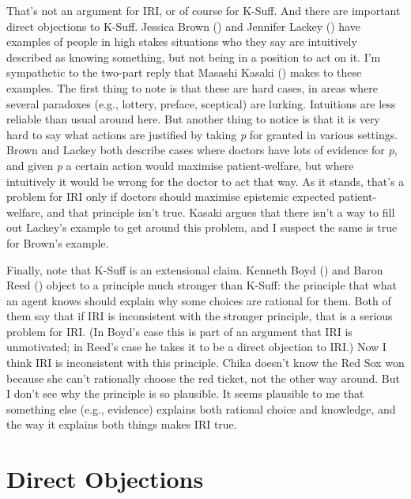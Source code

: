 \documentclass[
  11pt,
  letterpaper,
  DIV=11,
  numbers=noendperiod,
  twoside]{scrartcl}
\begin{document}
That's not an argument for IRI, or of course for K-Suff. And there are
important direct objections to K-Suff. Jessica Brown
() and Jennifer Lackey
() have examples of people in high stakes
situations who they say are intuitively described as knowing something,
but not being in a position to act on it. I'm sympathetic to the
two-part reply that Masashi Kasaki ()
makes to these examples. The first thing to note is that these are hard
cases, in areas where several paradoxes (e.g., lottery, preface,
sceptical) are lurking. Intuitions are less reliable than usual around
here. But another thing to notice is that it is very hard to say what
actions are justified by taking \emph{p} for granted in various
settings. Brown and Lackey both describe cases where doctors have lots
of evidence for \emph{p}, and given \emph{p} a certain action would
maximise patient-welfare, but where intuitively it would be wrong for
the doctor to act that way. As it stands, that's a problem for IRI only
if doctors should maximise epistemic expected patient-welfare, and that
principle isn't true. Kasaki argues that there isn't a way to fill out
Lackey's example to get around this problem, and I suspect the same is
true for Brown's example.

Finally, note that K-Suff is an extensional claim. Kenneth Boyd
() and Baron Reed
() object to a principle much stronger than
K-Suff: the principle that what an agent knows should explain why some
choices are rational for them. Both of them say that if IRI is
inconsistent with the stronger principle, that is a serious problem for
IRI. (In Boyd's case this is part of an argument that IRI is
unmotivated; in Reed's case he takes it to be a direct objection to
IRI.) Now I think IRI is inconsistent with this principle. Chika doesn't
know the Red Sox won because she can't rationally choose the red ticket,
not the other way around. But I don't see why the principle is so
plausible. It seems plausible to me that something else (e.g., evidence)
explains both rational choice and knowledge, and the way it explains
both things makes IRI true.

\section{Direct Objections}\label{directobjections}
\end{document}
